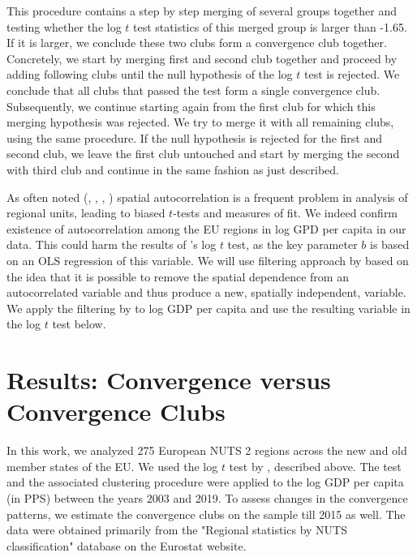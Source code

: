 \documentclass[11pt]{article}
\begin{document}
This procedure contains a step by step merging of several groups together and testing whether the log $t$ test statistics of this merged group is larger than -1.65. If it is larger, we conclude these two clubs form a convergence club together. Concretely, we start by merging first and second club together and proceed by adding following clubs until the null hypothesis of the log $t$ test is rejected. We conclude that all clubs that passed the test form a single convergence club. Subsequently, we continue starting again from the first club for which this merging hypothesis was rejected. We try to merge it with all remaining clubs, using the same procedure. If the null hypothesis is rejected for the first and second club, we leave the first club untouched and start by merging the second with third club and continue in the same fashion as just described.

As often noted (\citet{dall2008regional}, \citet{magrini2004regional}, \citet{anselin1991properties}, \citet{anselin2001spatial}) spatial autocorrelation is a frequent problem in analysis of regional units, leading to biased $t$-tests and measures of fit. We indeed confirm existence of autocorrelation among the EU regions in log GPD per capita in our data. This could harm the results of \citeauthor{phillips2007transition}'s log $t$ test, as the key parameter $b$ is based on an OLS regression of this variable. We will use filtering approach by \cite{getis2002comparative} based on the idea that it is possible to remove the spatial dependence from an autocorrelated variable and thus produce a new, spatially independent, variable. We apply the filtering by \cite{getis2002comparative} to log GDP per capita and use the resulting variable in the log $t$ test below.



\section{Results: Convergence versus Convergence Clubs}
In this work, we analyzed 275 European NUTS 2 regions across the new and old member states of the EU. We used the log $t$ test by \citet{phillips2009economic}, described above. The test and the associated clustering procedure were applied to the log GDP per capita (in PPS) between the years 2003 and 2019. To assess changes in the convergence patterns, we estimate the convergence clubs on the sample till 2015 as well. The data were obtained primarily from the "Regional statistics by NUTS classification" database on the Eurostat website.
\end{document}

